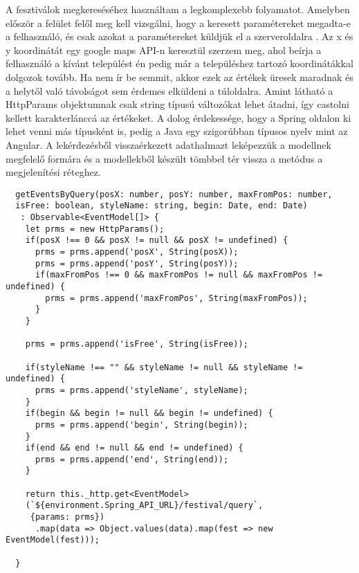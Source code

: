 

\begin{java}
\end{java}

A fesztiválok megkereséséhez használtam a legkomplexebb folyamatot. Amelyben először a felület felől meg kell vizsgálni, hogy a keresett paramétereket megadta-e a felhasználó, és csak azokat a paramétereket küldjük el a szerveroldalra . Az x és y koordinátát egy google maps API-n keresztül szerzem meg, ahol beírja a felhasználó a kívánt települést én pedig már a településhez tartozó koordinátákkal dolgozok tovább. Ha nem ír be semmit, akkor ezek az értékek üresek maradnak és a helytől való távolságot sem érdemes elküldeni a túloldalra. Amint látható a HttpParams objektumnak csak string típusú változókat lehet átadni, így castolni kellett karakterlánccá az értékeket. A dolog érdekessége, hogy a Spring oldalon ki lehet venni más típusként is, pedig a Java egy szigorúbban típusos nyelv mint az Angular.
A lekérdezésből visszaérkezett adathalmazt leképezzük a modellnek megfelelő formára és a modellekből készült tömbbel tér vissza a metódus a megjelenítési réteghez.

\begin{verbatim}
  getEventsByQuery(posX: number, posY: number, maxFromPos: number, 
  isFree: boolean, styleName: string, begin: Date, end: Date)
   : Observable<EventModel[]> {
    let prms = new HttpParams();
    if(posX !== 0 && posX != null && posX != undefined) {
      prms = prms.append('posX', String(posX));
      prms = prms.append('posY', String(posY));
      if(maxFromPos !== 0 && maxFromPos != null && maxFromPos != undefined) {
        prms = prms.append('maxFromPos', String(maxFromPos));
      }
    }

    prms = prms.append('isFree', String(isFree));

    if(styleName !== "" && styleName != null && styleName != undefined) {
      prms = prms.append('styleName', styleName);
    }
    if(begin && begin != null && begin != undefined) {
      prms = prms.append('begin', String(begin));
    }
    if(end && end != null && end != undefined) {
      prms = prms.append('end', String(end));
    }

    return this._http.get<EventModel>
    (`${environment.Spring_API_URL}/festival/query`,
     {params: prms})
      .map(data => Object.values(data).map(fest => new EventModel(fest)));

  }
\end{verbatim}